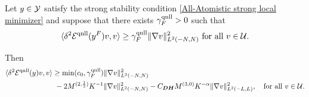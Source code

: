\begin{theorem}\label{Stability}
	Let $y\in\mathcal{Y}$ satisfy the strong stability condition \eqref{All-Atomistic strong local minimizer} and suppose that there exists $\gamma^{{\rm qnll}}_{F} >0$ such that
	\begin{equation}\label{Uniform solution of NL-L stab assumption}
		\langle \delta^{2}\mathcal{E}^{{\rm qnll}} (y^{F})v,v\rangle \ge \gamma^{{\rm qnll}}_{F} \Vert \nabla v\Vert^{2}_{L^{2}(-N,N)} \text{ for all } v \in \mathcal{U}.
	\end{equation}
	
	Then
	\begin{equation}\label{Result of stability}
		\begin{split}
			\langle \delta^{2}\mathcal{E}^{{\rm qnll}} (y)v,v\rangle &\ge \min(c_{0},\gamma^{{\rm qnll}}_{F})\Vert \nabla v \Vert_{L^{2}(-N,N)}^{2}\\
			&\ - 2M^{(2,\frac{1}{2})}K^{-1} \Vert \nabla v \Vert_{L^{2}(-N,N)}^{2} - C_{\bm{DH}} M^{(3,0)}K^{-\alpha} \Vert \nabla v \Vert_{L^{2}(-L,L)}^{2}, \quad \text{for all } v \in \mathcal{U}.
		\end{split}
	\end{equation}
\end{theorem}

